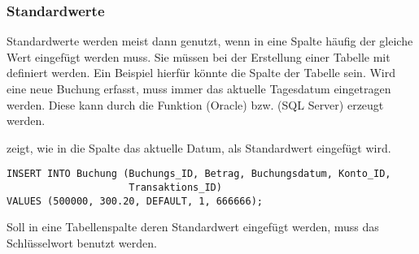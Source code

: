 \subsubsection{Standardwerte}
\label{defaultvalues}
Standardwerte werden meist dann genutzt, wenn in eine Spalte häufig
der gleiche Wert eingefügt werden muss. Sie müssen bei der
Erstellung einer Tabelle mit definiert werden. Ein Beispiel hierfür
könnte die Spalte  der Tabelle
 sein. Wird eine neue Buchung erfasst, muss immer
das aktuelle Tagesdatum eingetragen werden. Diese kann durch die
Funktion  (Oracle) bzw.
 (SQL Server) erzeugt werden.

 zeigt, wie in die Spalte
 das aktuelle Datum, als Standardwert
eingefügt wird.
\begin{lstlisting}[language=oracle_sql,caption={Einfügen eines Standardwertes},label=sql07_06]
INSERT INTO Buchung (Buchungs_ID, Betrag, Buchungsdatum, Konto_ID,
                     Transaktions_ID)
VALUES (500000, 300.20, DEFAULT, 1, 666666);
          \end{lstlisting}
\begin{merke}
    Soll in eine Tabellenspalte deren Standardwert eingefügt werden,
    muss das Schlüsselwort  benutzt werden.
\end{merke}
